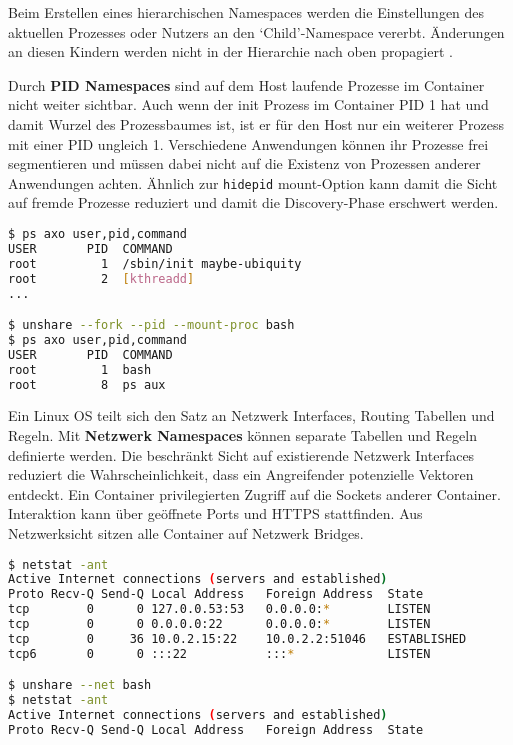 Beim Erstellen eines hierarchischen Namespaces werden die Einstellungen des aktuellen Prozesses oder Nutzers an den `Child'-Namespace vererbt. Änderungen an diesen Kindern werden nicht in der Hierarchie nach oben propagiert \cite{man-7-ns}. 

Durch \textbf{PID Namespaces} sind auf dem Host laufende Prozesse im Container nicht weiter sichtbar. Auch wenn der init Prozess im Container PID 1 hat und damit Wurzel des Prozessbaumes ist, ist er für den Host nur ein weiterer Prozess mit einer PID ungleich 1. Verschiedene Anwendungen können ihr Prozesse frei segmentieren und müssen dabei nicht auf die Existenz von Prozessen anderer
Anwendungen achten. Ähnlich zur \texttt{hidepid} mount-Option kann damit die Sicht auf fremde Prozesse reduziert und damit die Discovery-Phase erschwert werden.

\begin{lstlisting}[language=sh,caption={Isolation von Prozessen über PID namespaces}]
$ ps axo user,pid,command
USER       PID  COMMAND
root         1  /sbin/init maybe-ubiquity
root         2  [kthreadd]
...

$ unshare --fork --pid --mount-proc bash
$ ps axo user,pid,command
USER       PID  COMMAND
root         1  bash
root         8  ps aux
\end{lstlisting}

Ein Linux OS teilt sich den Satz an Netzwerk Interfaces, Routing Tabellen und Regeln. Mit \textbf{Netzwerk Namespaces} können separate Tabellen und Regeln definierte werden. Die beschränkt Sicht auf existierende Netzwerk Interfaces reduziert die Wahrscheinlichkeit, dass ein Angreifender potenzielle Vektoren entdeckt.
Ein Container privilegierten Zugriff auf die Sockets anderer Container. Interaktion kann über geöffnete Ports und HTTPS stattfinden.
Aus Netzwerksicht sitzen alle Container auf Netzwerk Bridges. %

\begin{lstlisting}[language=sh,basicstyle=\footnotesize\ttfamily,caption={Isolation der aktiven Internetverbindungen durch einen Netzwerk Namespace}]
$ netstat -ant
Active Internet connections (servers and established)
Proto Recv-Q Send-Q Local Address   Foreign Address  State
tcp        0      0 127.0.0.53:53   0.0.0.0:*        LISTEN
tcp        0      0 0.0.0.0:22      0.0.0.0:*        LISTEN
tcp        0     36 10.0.2.15:22    10.0.2.2:51046   ESTABLISHED
tcp6       0      0 :::22           :::*             LISTEN

$ unshare --net bash
$ netstat -ant
Active Internet connections (servers and established)
Proto Recv-Q Send-Q Local Address   Foreign Address  State
\end{lstlisting}

